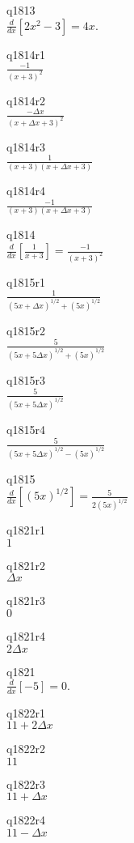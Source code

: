q1813\\
\(\displaystyle \frac{d}{dx} [2x^2 - 3] = 4x. \)

q1814r1\\
\(\displaystyle \frac{-1}{(x+3)^2} \)

q1814r2\\
\(\displaystyle \frac{-\Delta x}{(x+\Delta x + 3)^2} \)

q1814r3\\
\(\displaystyle \frac{1}{(x+3)(x+\Delta x + 3)} \)

q1814r4\\
\(\displaystyle \frac{-1}{(x+3)(x + \Delta x + 3)} \)

q1814\\
\(\displaystyle \frac{d}{dx} \left [ \frac{1}{x+3} \right ] = \frac{-1}{(x+3)^2} \)

q1815r1\\
\(\displaystyle \frac{1}{(5x + \Delta x)^{1/2} + (5x)^{1/2}} \)

q1815r2\\
\(\displaystyle \frac{5}{(5x + 5\Delta x)^{1/2} + (5x)^{1/2}} \)

q1815r3\\
\(\displaystyle \frac{5}{(5x + 5\Delta x)^{1/2}} \)

q1815r4\\
\(\displaystyle \frac{5}{(5x + 5\Delta x)^{1/2} - (5x)^{1/2}} \)

q1815\\
\(\displaystyle \frac{d}{dx} [(5x)^{1/2}] = \frac{5}{2(5x)^{1/2}} \)

q1821r1\\
\(\displaystyle 1 \)

q1821r2\\
\(\displaystyle \Delta x \)

q1821r3\\
\(\displaystyle 0 \)

q1821r4\\
\(\displaystyle 2\Delta x \)

q1821\\
\(\displaystyle \frac{d}{dx} [-5] = 0. \)

q1822r1\\
\(\displaystyle 11 + 2\Delta x \)

q1822r2\\
\(\displaystyle 11 \)

q1822r3\\
\(\displaystyle 11 + \Delta x \)

q1822r4\\
\(\displaystyle 11 - \Delta x \)

